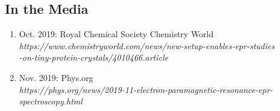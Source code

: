 \subsection*{In the Media}
\begin{enumerate}
\itemsep0em 
    \item Oct. 2019: Royal Chemical Society Chemistry World \\
    \textit{https://www.chemistryworld.com/news/new-setup-enables-epr-studies \\ -on-tiny-protein-crystals/4010466.article}
    
    \item Nov. 2019: Phys.org \\
    \textit{https://phys.org/news/2019-11-electron-paramagnetic-resonance-epr-spectroscopy.html}
    
\end{enumerate}
    
